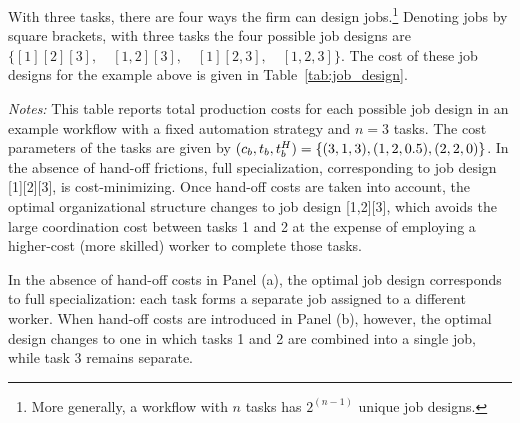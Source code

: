 With three tasks, there are four ways the firm can design jobs.\footnote{
More generally, a workflow with $n$ tasks has $2^{(n-1)}$ unique job designs.
} 
Denoting jobs by square brackets, with three tasks the four possible job designs are 
$\{[1][2][3], \quad [1,2][3], \quad [1][2,3], \quad [1,2,3]\}$.
The cost of these job designs for the example above is given in Table~\ref{tab:job_design}.
\begin{table}[ht!]
    \caption{Role of Hand-off Costs in Organizational Structure}
    \vspace{-0.4cm}
    \begin{center}
    \label{tab:job_design}
    \end{center}
    \footnotesize{\emph{Notes:} This table reports total production costs for each possible job design in an example workflow with a fixed automation strategy and $n = 3$ tasks. 
    The cost parameters of the tasks are given by $(c_{b},t_{b},t^{H}_{b})=\{(3,1,3),(1,2,0.5),(2,2,0)\}$.
    In the absence of hand-off frictions, full specialization, corresponding to job design [1][2][3], is cost-minimizing. 
    Once hand-off costs are taken into account, the optimal organizational structure changes to job design [1,2][3], which avoids the large coordination cost between tasks 1 and 2 at the expense of employing a higher-cost (more skilled) worker to complete those tasks.
    }
\end{table}
In the absence of hand-off costs in Panel (a), the optimal job design corresponds to full specialization: each task forms a separate job assigned to a different worker.
When hand-off costs are introduced in Panel (b), however, the optimal design changes to one in which tasks 1 and 2 are combined into a single job, while task 3 remains separate.
